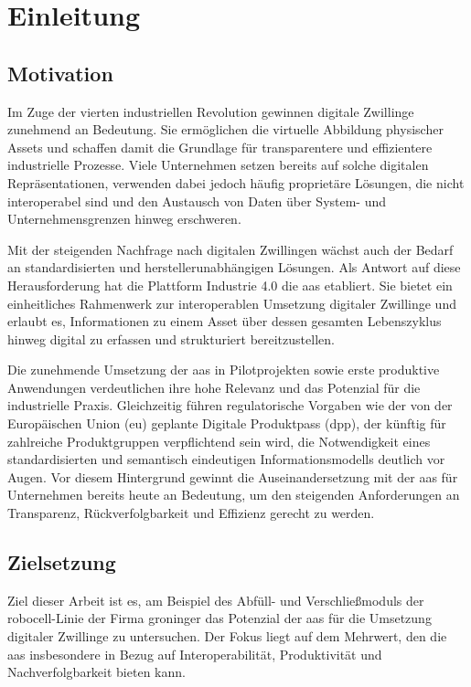 \thispagestyle{fancy}
\section{Einleitung}
\subsection{Motivation}
\label{sec:Motivation}
Im Zuge der vierten industriellen Revolution gewinnen digitale Zwillinge zunehmend an Bedeutung. 
Sie ermöglichen die virtuelle Abbildung physischer Assets und schaffen damit die Grundlage für transparentere und effizientere industrielle Prozesse. 
Viele Unternehmen setzen bereits auf solche digitalen Repräsentationen, verwenden dabei jedoch häufig proprietäre Lösungen, die nicht interoperabel sind und den Austausch von Daten über System- und Unternehmensgrenzen hinweg erschweren.

Mit der steigenden Nachfrage nach digitalen Zwillingen wächst auch der Bedarf an standardisierten und herstellerunabhängigen Lösungen. 
Als Antwort auf diese Herausforderung hat die Plattform Industrie 4.0 die \ac{aas} etabliert. 
Sie bietet ein einheitliches Rahmenwerk zur interoperablen Umsetzung digitaler Zwillinge und erlaubt es, Informationen zu einem Asset über dessen gesamten Lebenszyklus hinweg digital zu erfassen und strukturiert bereitzustellen.

Die zunehmende Umsetzung der \acs{aas} in Pilotprojekten sowie erste produktive Anwendungen verdeutlichen ihre hohe Relevanz und das Potenzial für die industrielle Praxis. 
Gleichzeitig führen regulatorische Vorgaben wie der von der Europäischen Union (\acs{eu}) geplante Digitale Produktpass (\acs{dpp}), der künftig für zahlreiche Produktgruppen verpflichtend sein wird, die Notwendigkeit eines standardisierten und semantisch eindeutigen Informationsmodells deutlich vor Augen.
Vor diesem Hintergrund gewinnt die Auseinandersetzung mit der \acs{aas} für Unternehmen bereits heute an Bedeutung, um den steigenden Anforderungen an Transparenz, Rückverfolgbarkeit und Effizienz gerecht zu werden.

\subsection{Zielsetzung}

Ziel dieser Arbeit ist es, am Beispiel des Abfüll- und Verschließmoduls der robocell-Linie der Firma groninger das Potenzial der \acs{aas} für die Umsetzung digitaler Zwillinge zu untersuchen. 
Der Fokus liegt auf dem Mehrwert, den die \acs{aas} insbesondere in Bezug auf Interoperabilität, Produktivität und Nachverfolgbarkeit bieten kann. 

